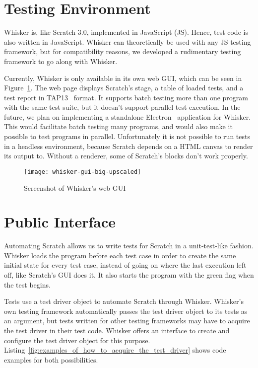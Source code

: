 \section{Testing Environment}
\label{sec:testing_environment}

Whisker is, like Scratch 3.0, implemented in JavaScript (JS).
Hence, test code is also written in JavaScript.
Whisker can theoretically be used with any JS testing framework,
but for compatibility reasons, we developed a rudimentary testing framework to go along with Whisker.
\parspace

Currently, Whisker is only available in its own web GUI, which can be seen in Figure~\ref{fig:whisker_gui}.
The web page displays Scratch's stage, a table of loaded tests, and a test report in TAP13~\cite{tap} format.
It supports batch testing more than one program with the same test suite,
but it doesn't support parallel test execution.
In the future, we plan on implementing a standalone Electron~\cite{electron} application for Whisker.
This would facilitate batch testing many programs,
and would also make it possible to test programs in parallel.
Unfortunately it is not possible to run tests in a headless environment,
because Scratch depends on a HTML canvas to render its output to.
Without a renderer, some of Scratch's blocks don't work properly.

\begin{figure}[htpb]
    \centering
    \texttt{[image: whisker-gui-big-upscaled]}
    \caption{Screenshot of Whisker's web GUI}
    \label{fig:whisker_gui}
\end{figure}

\section{Public Interface}
\label{sec:public_interface}

Automating Scratch allows us to write tests for Scratch in a unit-test-like fashion.
Whisker loads the program before each test case in order to create the same initial state for every test case,
instead of going on where the last execution left off, like Scratch's GUI does it.
It also starts the program with the green flag when the test begins.
\parspace

Tests use a test driver object to automate Scratch through Whisker.
Whisker's own testing framework automatically passes the test driver object to its tests as an argument,
but tests written for other testing frameworks may have to acquire the test driver in their test code.
Whisker offers an interface to create and configure the test driver object for this purpose.
Listing~\ref{fig:examples_of_how_to_acquire_the_test_driver} shows code examples for both possibilities.

